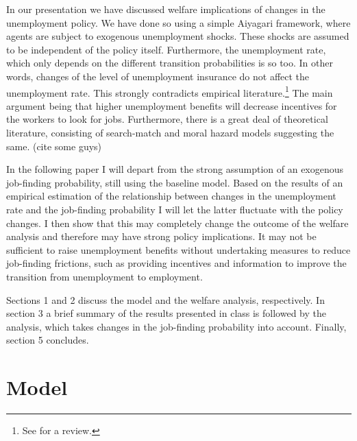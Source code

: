 \documentclass[a4paper,12pt]{article}
\begin{document}
In our presentation we have discussed welfare implications of changes in the unemployment policy. We have done so using a simple Aiyagari framework, where agents are subject to exogenous unemployment shocks. These shocks are assumed to be independent of the policy itself. Furthermore, the unemployment rate, which only depends on the different transition probabilities is so too. In other words, changes of the level of unemployment insurance do not affect the unemployment rate. This strongly contradicts empirical literature.\footnote{See \citep{decker} for a review.} The main argument being that higher unemployment benefits will decrease incentives for the workers to look for jobs. Furthermore, there is a great deal of theoretical literature, consisting of search-match and moral hazard models suggesting the same. (cite some guys) 

In the following paper I will depart from the strong assumption of an exogenous job-finding probability, still using the baseline model. Based on the results of an empirical estimation of the relationship between changes in the unemployment rate and the job-finding probability I will let the latter fluctuate with the policy changes. I then show that this may completely change the outcome of the welfare analysis and therefore may have strong policy implications. It may not be sufficient to raise unemployment benefits without undertaking measures to reduce job-finding frictions, such as providing incentives and information to improve the transition from unemployment to employment.

Sections 1 and 2 discuss the model and the welfare analysis, respectively. In section 3 a brief summary of the results presented in class is followed by the analysis, which takes changes in the job-finding probability into account. Finally, section 5 concludes. 


\section{Model}
\end{document}
